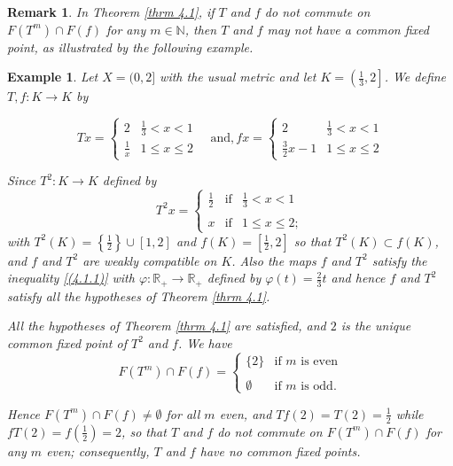 \documentclass[a4paper,12pt,oneside]{article}
\newtheorem{remark}[theorem]{Remark}
\newtheorem{example}[theorem]{Example}
\numberwithin{equation}{section}
\begin{document}
\begin{remark}
    In Theorem \eqref{thrm 4.1}, if $T$ and $f$ do not commute on $F(T^m)\cap F(f)$ for any $m\in \mathbb{N}$, then $T$ and $f$ may not have a common fixed point, as illustrated by the following example.
\end{remark}

\begin{example}
    Let $X=(0,2]$ with the usual metric and let $K=\left(\frac{1}{3},2\right]$. We define $T,f:K\to K$ by

    \[
    Tx = \begin{cases} 
        2 & \frac{1}{3} < x < 1 \\
        \frac{1}{x} & 1 \leq x \leq 2 
    \end{cases} \quad \text{and},
    fx = \begin{cases} 
        2 & \frac{1}{3} < x < 1 \\
        \frac{3}{2}x - 1 & 1 \leq x \leq 2 
    \end{cases}
    \]

Since $T^2:K\to K$ defined by
\[
T^2x = \left\{
\begin{array}{ccc}
\frac{1}{2} & \text{if} & \frac{1}{3}<x<1 \\ 
\\ 
x & \text{if} & 1\leq x\leq 2;
\end{array}
\right.
\]
with $T^2(K)=\left\{\frac{1}{2}\right\}\cup[1,2]$ and $f(K)=\left[\frac{1}{2},2\right]$ so that $T^2(K)\subset f(K)$, and $f$ and $T^2$ are weakly compatible on $K$. Also the maps $f$ and $T^2$ satisfy the inequality \eqref{(4.1.1)} with $\varphi:\mathbb{R}_{+}\to \mathbb{R}_{+}$ defined by $\varphi(t)=\frac{2}{3}t$ and hence $f$ and $T^2$ satisfy all the hypotheses of Theorem \eqref{thrm 4.1}.


All the hypotheses of Theorem \eqref{thrm 4.1} are satisfied, and $2$ is the unique common fixed point of $T^{2}$ and $f$. We have
\[
F(T^{m}) \cap F(f) = \left\{
\begin{array}{cc}
\{2\} & \text{if } m \text{ is even} \\ 
\\ 
\emptyset & \text{if } m \text{ is odd.}
\end{array}
\right.
\]

Hence $F(T^{m}) \cap F(f) \neq \emptyset$ for all $m$ even, and $Tf(2) = T(2) = \frac{1}{2}$ while $fT(2) = f\left(\frac{1}{2}\right) = 2$, so that $T$ and $f$ do not commute on $F(T^{m}) \cap F(f)$ for any $m$ even; consequently, $T$ and $f$ have no common fixed points.
\end{example}
\end{document}
